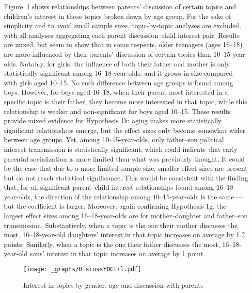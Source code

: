 \documentclass[
  letterpaper,
  DIV=11,
  numbers=noendperiod]{scrreprt}
\begin{document}
Figure~\ref{fig-discussyoctrl} shows relationships between parents'
discussion of certain topics and children's interest in those topics
broken down by age group. For the sake of simplicity and to avoid small
sample sizes, topic-by-topic analyses are excluded, with all analyses
aggregating each parent discussion--child interest pair. Results are
mixed, but seem to show that in some respects, older teenagers (ages
16--18) are more influenced by their parents' discussion of certain
topics than 10--15-year-olds. Notably, for girls, the influence of both
their father and mother is only statistically significant among 16--18
year-olds, and it grows in size compared with girls aged 10--15. No such
difference between age groups is found among boys. However, for boys
aged 16--18, when their parent most interested in a specific topic is
their father, they become more interested in that topic, while this
relationship is weaker and non-significant for boys aged 10--15. These
results provide mixed evidence for Hypothesis 1k: aging makes more
statistically significant relationships emerge, but the effect sizes
only become somewhat wider between age groups. Yet, among
10--15-year-olds, only father--son political interest transmission is
statistically significant, which could indicate that early parental
socialization is more limited than what was previously thought. It could
be the case that due to a more limited sample size, smaller effect sizes
are present but do not reach statistical significance. This would be
consistent with the finding that, for all significant parent--child
interest relationships found among 16--18-year-olds, the direction of
the relationship among 10--15-year-olds is the same --- but the
coefficient is larger. Moreover, again confirming Hypothesis 1g, the
largest effect sizes among 16--18-year-olds are for mother--daughter and
father--son transmission. Substantively, when a topic is the one their
mother discusses the most, 16--18-year-old daughters' interest in that
topic increases on average by 1.2 points. Similarly, when a topic is the
one their father discusses the most, 16--18-year-old sons' interest in
that topic increases on average by 1 point.

\begin{figure}

{\centering \texttt{[image: \_graphs/DiscussYOCtrl.pdf]}

}

\caption{\label{fig-discussyoctrl}Interest in topics by gender, age and
discussion with parents}

\end{figure}
\end{document}
